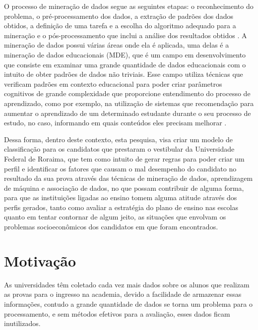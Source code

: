 \par
 O processo de mineração de dados segue as seguintes etapas: o reconhecimento do problema, o pré-processamento dos dados, a extração de padrões dos dados obtidos, a definição de uma tarefa e a escolha do algoritmo adequado para a mineração e o pós-processamento que inclui a análise dos resultados obtidos \cite{Stulp2014}. A mineração de dados possui várias áreas onde ela é aplicada, uma delas é a mineração de dados educacionais (MDE), que é um campo em desenvolvimento que consiste em examinar uma grande quantidade de dados educacionais com o intuito de obter padrões de dados não triviais. Esse campo utiliza técnicas que verificam padrões em contexto educacional para poder criar parâmetros cognitivos de grande complexidade que proporcione entendimento do processo de aprendizado, como por exemplo, na utilização de sistemas que recomendação para aumentar o aprendizado de um determinado estudante durante o seu processo de estudo, no caso, informando em quais conteúdos eles precisam melhorar \cite{Cazella2012}.

\par
Dessa forma, dentro deste contexto, esta pesquisa, visa criar um modelo de classificação para os candidatos que prestaram o vestibular da Universidade Federal de Roraima,  que tem como intuito de gerar regras para poder criar um perfil e identificar os fatores que causam o mal desempenho do candidato no resultado da sua prova através das técnicas de mineração de dados, aprendizagem de máquina e associação de dados, no que possam contribuir de alguma forma, para que as instituições ligadas ao ensino tomem alguma atitude através dos perfis gerados, tanto como avaliar a estratégia do plano de ensino nas escolas quanto em tentar contornar de algum jeito, as situações que envolvam os problemas socioeconômicos dos candidatos em que foram encontrados.







\section{Motivação}

As universidades têm coletado cada vez mais dados sobre os alunos que realizam as provas para o ingresso na academia, devido a facilidade de armazenar essas informações, contudo a grande quantidade de dados se torna um problema para o processamento, e sem métodos efetivos para a avaliação, esses dados ficam inutilizados.

